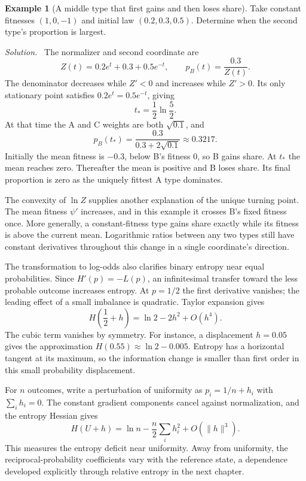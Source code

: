 \documentclass[11pt,oneside,openany]{book}
\theoremstyle{definition}
\newtheorem{example}{Example}[chapter]
\theoremstyle{remark}
\newenvironment{solution}{\par\smallskip\noindent\textit{Solution.}\ }{\par\smallskip}
\numberwithin{equation}{chapter}
\begin{document}
\begin{example}[A middle type that first gains and then loses share]
Take constant fitnesses $(1,0,-1)$ and initial law $(0.2,0.3,0.5)$. Determine when the second type's proportion is largest.
\begin{solution}
The normalizer and second coordinate are
\[
Z(t)=0.2e^t+0.3+0.5e^{-t},\qquad p_B(t)=\frac{0.3}{Z(t)}.
\]
The denominator decreases while $Z'<0$ and increases while $Z'>0$. Its only stationary point satisfies $0.2e^t=0.5e^{-t}$, giving
\[
t_* =\frac12\ln\frac52.
\]
At that time the A and C weights are both $\sqrt{0.1}$, and
\[
p_B(t_*)=\frac{0.3}{0.3+2\sqrt{0.1}}\approx0.3217.
\]
Initially the mean fitness is $-0.3$, below B's fitness 0, so B gains share. At $t_*$ the mean reaches zero. Thereafter the mean is positive and B loses share. Its final proportion is zero as the uniquely fittest A type dominates.
\end{solution}
\end{example}

The convexity of $\ln Z$ supplies another explanation of the unique turning point. The mean fitness $\psi'$ increases, and in this example it crosses B's fixed fitness once. More generally, a constant-fitness type gains share exactly while its fitness is above the current mean. Logarithmic ratios between any two types still have constant derivatives throughout this change in a single coordinate's direction.

The transformation to log-odds also clarifies binary entropy near equal probabilities. Since $H'(p)=-L(p)$, an infinitesimal transfer toward the less probable outcome increases entropy. At $p=1/2$ the first derivative vanishes; the leading effect of a small imbalance is quadratic. Taylor expansion gives
\[
H\left(\frac12+h\right)=\ln2-2h^2+O(h^4).
\]
The cubic term vanishes by symmetry. For instance, a displacement $h=0.05$ gives the approximation $H(0.55)\approx\ln2-0.005$. Entropy has a horizontal tangent at its maximum, so the information change is smaller than first order in this small probability displacement.

For $n$ outcomes, write a perturbation of uniformity as $p_i=1/n+h_i$ with $\sum_i h_i=0$. The constant gradient components cancel against normalization, and the entropy Hessian gives
\[
H(U+h)=\ln n-\frac n2\sum_i h_i^2+O(\|h\|^3).
\]
This measures the entropy deficit near uniformity. Away from uniformity, the reciprocal-probability coefficients vary with the reference state, a dependence developed explicitly through relative entropy in the next chapter.
\end{document}
